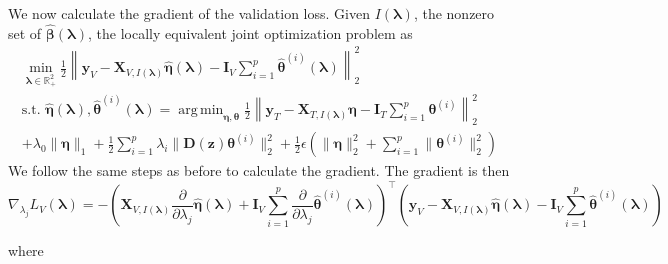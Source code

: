 \documentclass[12pt,letterpaper]{article}
\DeclareMathOperator*{\argmin}{arg\,min}
\begin{document}
We now calculate the gradient of the validation loss. Given $I(\boldsymbol \lambda)$, the nonzero set of $\hat{\boldsymbol{\beta}}(\boldsymbol{\lambda})$, the locally equivalent joint optimization problem as
\begin{equation}
\begin{array}{c}
\min_{\boldsymbol\lambda \in \mathbb{R}^2_{+}} \frac{1}{2}
\left \|
\boldsymbol{y}_V
- \boldsymbol{X}_{V, I(\boldsymbol \lambda)} \hat{\boldsymbol{\eta}}(\boldsymbol{\lambda})
- \boldsymbol{I}_V \sum_{i=1}^p \hat{\boldsymbol{\theta}}^{(i)}(\boldsymbol{\lambda})
\right \|^2_2 \\
\text{s.t. }
\hat{\boldsymbol{\eta}}(\boldsymbol{\lambda}),
\hat{\boldsymbol{\theta}}^{(i)}(\boldsymbol{\lambda}) =
\argmin_{\boldsymbol \eta, \boldsymbol{\theta}}
\frac{1}{2} \left \|
\boldsymbol{y}_T
- \boldsymbol{X}_{T, I(\boldsymbol \lambda)}\boldsymbol{\eta}
- \boldsymbol{I}_T \sum_{i=1}^p \boldsymbol{\theta}^{(i)} \right \|^2_2 \\
+ \lambda_0 \| \boldsymbol{\eta} \|_1
+ \frac{1}{2} \sum_{i=1}^p \lambda_i \| \boldsymbol{D}(\boldsymbol{z}) \boldsymbol{\theta}^{(i)} \|_2^2
+ \frac{1}{2} \epsilon \left( \| \boldsymbol{\eta} \|_2^2 + \sum_{i=1}^p \| \boldsymbol{\theta}^{(i)} \|_2^2 \right )
\end{array}
\label{aplmRestricted}
\end{equation}
We follow the same steps as before to calculate the gradient. The gradient is then
\begin{equation*}
\nabla_{\lambda_j} L_V(\boldsymbol{\lambda}) =
- \left(
\boldsymbol{X}_{V, I(\boldsymbol\lambda)} \frac{\partial}{\partial \lambda_j} \hat{\boldsymbol\eta}(\boldsymbol{\lambda})
+ \boldsymbol{I}_V \sum_{i=1}^p \frac{\partial}{\partial \lambda_j} \hat{\boldsymbol\theta}^{(i)}(\boldsymbol{\lambda})
\right )^\top
\left (
\boldsymbol{y}_V
- \boldsymbol{X}_{V, I(\boldsymbol\lambda)} \hat{\boldsymbol\eta}(\boldsymbol{\lambda})
- \boldsymbol{I}_V \sum_{i=1}^p \hat{\boldsymbol\theta}^{(i)}(\boldsymbol{\lambda})
\right )
\end{equation*}

where
\end{document}
